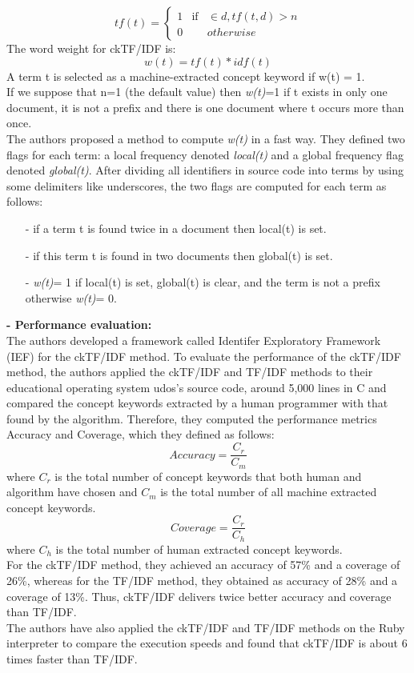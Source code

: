 \begin{equation}
tf(t) = \left\{ \begin{array}{rcl}
1 & \mbox{if} & \in d, tf(t, d) > n \\ 0 && otherwise
\end{array}\right.
\end{equation}
The word weight for ckTF/IDF is: 
\begin{equation}
w(t) = tf(t)* idf(t)
\end{equation}
A term t is selected as a machine-extracted concept keyword if w(t) = 1.\\
If we suppose that n=1 (the default value) then \textit{w(t)}=1 if t exists in only one document, it is not a prefix and there is one document where t occurs more than once. \\
The authors proposed a method to compute \textit{w(t)} in a fast way. They defined two flags for each term: a local frequency denoted \textit{local(t)} and a global frequency flag denoted \textit{global(t)}. 
After dividing all identifiers in source code into terms by using some delimiters like underscores, the two flags are computed for each term as follows: 
\begin{itemize}
\item [-] if a term t is found twice in a document then local(t) is set. 
\item [-] if this term t is found in two documents then global(t) is set. 
\item [-] \textit{w(t)}= 1 if local(t) is set, global(t) is clear, and the term is not a prefix otherwise \textit{w(t)}= 0. 
\end{itemize}
\textbf{- Performance evaluation:}\\
The authors developed a framework called Identifer Exploratory Framework (IEF) for the ckTF/IDF method.
To evaluate the performance of the ckTF/IDF method, the authors applied the ckTF/IDF and TF/IDF methods to their educational operating system udos’s source code, around 5,000 lines in C \cite{a:udos} and compared the concept keywords extracted by a human programmer with that found by the algorithm.  Therefore, they computed the performance metrics Accuracy and Coverage, which they defined as follows: 
\[Accuracy = \frac{C_{r}}{C_{m}}\]
where $C_{r}$ is the total number of concept keywords that both human and algorithm have chosen and $C_{m}$ is the total number of all machine extracted concept keywords.
\[Coverage = \frac{C_{r}}{C_{h}} \]
where  $C_{h}$ is the total number of human extracted concept keywords. \\
For the ckTF/IDF method, they achieved an accuracy of 57\%  and a coverage of 26\%, whereas for the TF/IDF method, they obtained as accuracy of 28\%  and a coverage of 13\%. Thus, ckTF/IDF delivers twice better accuracy and coverage than TF/IDF. \\
The authors have also applied the ckTF/IDF and TF/IDF methods on the Ruby interpreter to compare the execution speeds and found that ckTF/IDF is about 6 times faster than TF/IDF.
 
